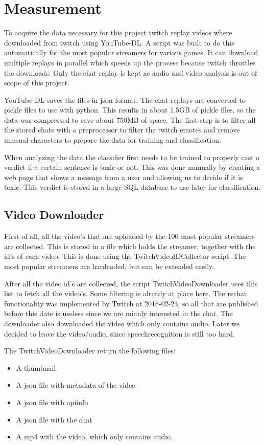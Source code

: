 \documentclass[final]{report}
\begin{document}
\chapter{Measurement}
\label{ch:measurement}


To acquire the data necessary for this project twitch replay videos where downloaded from twitch using YouTube-DL.
A script was built to do this automatically for the most popular streamers for various games. 
It can download multiple replays in parallel which speeds up the process because twitch throttles the downloads.
Only the chat replay is kept as audio and video analysis is out of scope of this project.

YouTube-DL saves the files in json format,  The chat replays are converted to pickle files to use with python. 
This results in about 1.5GB of pickle files, so the data was compressed to save about 750MB of space.
The first step is to filter all the stored chats with a preprocessor to filter the twitch emotes and remove unusual characters to prepare the data for training and classification.

When analyzing the data the classifier first needs to be trained to properly cast a verdict if a certain sentence is toxic or not.
This was done manually by creating a web page that shows a message from a user and allowing us to decide if it is toxic. This verdict is stored in a large SQL database to use later for classification.


\section{Video Downloader}
First of all, all the video's that are uploaded by the 100 most popular streamers are collected. This is stored in a file which holds the streamer, together with the id's of each video.
This is done using the TwitchVideoIDCollector script. The most popular streamers are hardcoded, but can be extended easily.

After all the video id's are collected, the script TwitchVideoDownloader uses this list to fetch all the video's.
Some filtering is already at place here. The rechat functionality was implemented by Twitch at 2016-02-23, so all that are published before this date is useless since we are mianly interested in the chat.
The downloader also downloaded the video which only contains audio. Later we decided to leave the video/audio, since speechrecognition is still too hard.

The TwitchVideoDownloader return the following files:
\begin{itemize}
\item A thumbnail
\item A json file with metadata of the video 
\item A json file with apiinfo
\item A json file with the chat
\item A mp4 with the video, which only contains audio.
\end{itemize}
\end{document}

